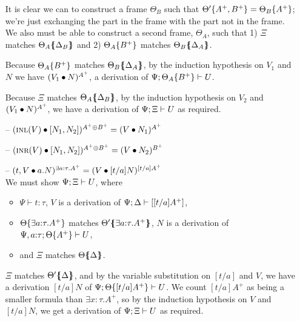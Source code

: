 \begin{itemize}
  It is clear we can to construct a frame $\Theta_B$ such that
  ${\Theta'}\{{A^+, B^+}\} = {\Theta_B}\{{A^+}\}$; we're just exchanging
  the part in the frame with the part not in the frame. We also 
  must be able to construct a second frame, $\Theta_A$, such that
  1) $\Xi$ matches ${\Theta_A}\mbox{$\{\hspace{-4pt}\{$}{\Delta_B}\mbox{$\}\hspace{-4pt}\}$}$ and 
  2) ${\Theta_A}\{{B^+}\}$ matches ${\Theta_B}\mbox{$\{\hspace{-4pt}\{$}{\Delta_A}\mbox{$\}\hspace{-4pt}\}$}$.


  Because ${\Theta_A}\{{B^+}\}$ matches ${\Theta_B}\mbox{$\{\hspace{-4pt}\{$}{\Delta_A}\mbox{$\}\hspace{-4pt}\}$}$,
  by the induction hypothesis on $V_1$ and $N$ we have
  $({V_1} \bullet {N})^{A^+}$, a derivation of 
  ${\Psi};{{\Theta_A}\{{B^+}\}} \vdash {U}$.

  Because $\Xi$ matches ${\Theta_A}\mbox{$\{\hspace{-4pt}\{$}{\Delta_B}\mbox{$\}\hspace{-4pt}\}$}$, by the induction
  hypothesis on $V_2$ and $({V_1} \bullet {N})^{A^+}$, we have a derivation
  of ${\Psi};{\Xi} \vdash {U}$ as required. \smallskip

\item[--] $({\textsc{inl}({V})} \bullet {[{N_1},{N_2}]})^{A^+ \oplus B^+} 
           = ({V} \bullet {N_1})^{A^+}$

\item[--] $({\textsc{inr}({V})} \bullet {[{N_1},{N_2}]})^{A^+ \oplus B^+} 
           = ({V} \bullet {N_2})^{B^+}$

\item[--] $({{t},{V}} \bullet {{a}.{N}})^{\exists a{:}\tau.A^+}
           = ({V} \bullet {[t/a]N})^{[t/a]A^+}$ \smallskip\\
  We must show ${\Psi};{\Xi} \vdash {U}$, where
  \begin{itemize}
  \item $\Psi \vdash t : \tau$, $V$ is a derivation of 
     ${\Psi};{\Delta} \vdash {[[t/a]A^+]}$,
  \item ${\Theta}\{{\exists a{:}\tau. A^+}\}$ 
     matches ${\Theta'}\mbox{$\{\hspace{-4pt}\{$}{\exists a{:}\tau. A^+}\mbox{$\}\hspace{-4pt}\}$}$, 
     $N$ is a derivation of 
     ${\Psi, a{:}\tau};{{\Theta}\{{A^+}\}} \vdash {U}$,
  \item and $\Xi$ matches ${\Theta}\mbox{$\{\hspace{-4pt}\{$}{\Delta}\mbox{$\}\hspace{-4pt}\}$}$.
  \end{itemize}
  $\Xi$ matches ${\Theta'}\mbox{$\{\hspace{-4pt}\{$}{\Delta}\mbox{$\}\hspace{-4pt}\}$}$, and by the variable
  substitution on $[t/a]$ and $V$, we have a derivation $[t/a]N$ of
  ${\Psi};{{\Theta}\{{[t/a]A^+}\}} \vdash {U}$.  We count $[t/a]A^+$ as
  being a smaller formula than $\exists x{:}\tau.A^+$, so by the
  induction hypothesis on $V$ and $[t/a]N$, we get a derivation of
  ${\Psi};{\Xi} \vdash {U}$ as required. \smallskip


\end{itemize}
